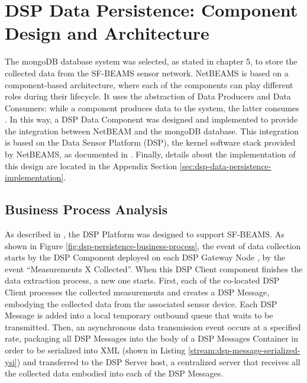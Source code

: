 

\chapter{DSP Data Persistence: Component Design and Architecture}

The mongoDB database system was selected, as stated in chapter 5, to store 
the collected data from the SF-BEAMS sensor network. NetBEAMS is based on a 
component-based architecture, where each of the components can play different
roles during their lifecycle. It uses the abstraction of Data Producers and 
Data Consumers: while a component produces data to the system, the latter 
consumes \cite{netbeams2009}. In this way, a DSP Data Component was designed
and implemented to provide the integration between NetBEAM and the mongoDB 
database. This integration is based on the Data Sensor Platform (DSP), the
kernel software stack provided by NetBEAMS, as documented in
\cite{netbeams-dsp-architecture}. Finally, details about the implementation of
this design are located in the Appendix Section
\ref{sec:dsp-data-persistence-implementation}.

\section{Business Process Analysis}
\label{sec:business-process-analysis}

As described in \cite{netbeams-dsp-architecture}, the DSP Platform was designed
to support SF-BEAMS. As shown in Figure \ref{fig:dsp-persistence-business-process}, 
the event of data collection starts by the DSP Component deployed on each 
DSP Gateway Node \cite{netbeams-dsp-architecture}, by the event ``Measurements
X Collected''. When this DSP Client component finishes the data extraction
process, a new one starts. First, each of the co-located DSP Client processes 
the collected measurements and creates a DSP Message, embodying the collected 
data from the associated sensor device. Each DSP Message is added into a local
temporary outbound queue that waits to be transmitted. Then, an asynchronous 
data transmission event occurs at a specified rate, packaging all DSP
Messages into the body of a DSP Messages Container in order to be serialized
into XML (shown in Listing \ref{stream:dsp-message-serialized-ysi}) and
transferred to the DSP Server host, a centralized server that receives all the
collected data embodied into each of the DSP Messages.

